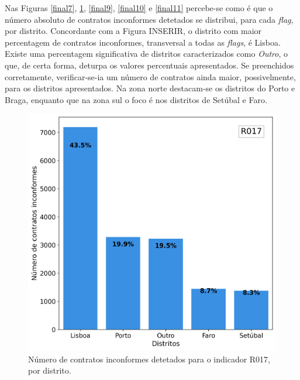 Nas Figuras \ref{final7}, \ref{final8}, \ref{final9}, \ref{final10} e \ref{final11} percebe-se como é que o número absoluto de contratos inconformes detetados se distribui, para cada \textit{flag}, por distrito. Concordante com a Figura INSERIR, o distrito com maior percentagem de contratos inconformes, transversal a todas as \textit{flags}, é Lisboa. Existe uma percentagem significativa de distritos caracterizados como \textit{Outro}, o que, de certa forma, deturpa os valores percentuais apresentados. Se preenchidos corretamente, verificar-se-ia um número de contratos ainda maior, possivelmente, para os distritos apresentados. Na zona norte destacam-se os distritos do Porto e Braga, enquanto que na zona sul o foco é nos distritos de Setúbal e Faro. 

\clearpage

\begin{figure}[H]
	\centering
	\begin{minipage}{.44\linewidth}
		\includegraphics[width=\linewidth]{imagens/final/bar_R017.png}
				\caption{Número de contratos inconformes detetados para o indicador R017, por distrito.}
		\label{final8}
		

\end{minipage}
\end{figure}
